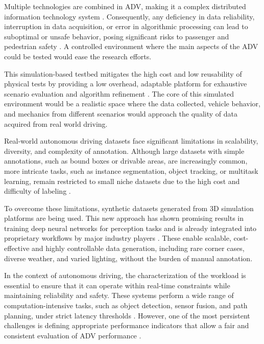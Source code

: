  Multiple technologies are combined in ADV, making it a complex distributed information technology system \cite{Traub2017}. Consequently, any deficiency in data reliability, interruption in data acquisition, or error in algorithmic processing can lead to suboptimal or unsafe behavior, posing significant risks to passenger and pedestrian safety \cite{Zhao2024}. A controlled environment where the main aspects of the ADV could be tested would ease the research efforts. 

This simulation-based testbed mitigates the high cost and low reusability of physical tests by providing a low overhead, adaptable platform for exhaustive scenario evaluation and algorithm refinement \cite{Cao2024AutomaticPreScan, Jeon2024ImplementationAlgorithms}. The core of this simulated environment would be a realistic space where the data collected, vehicle behavior, and mechanics from different scenarios would approach the quality of data acquired from real world driving.

Real-world autonomous driving datasets face significant limitations in scalability, diversity, and complexity of annotation. Although large datasets with simple annotations, such as bound boxes or drivable areas, are increasingly common, more intricate tasks, such as instance segmentation, object tracking, or multitask learning, remain restricted to small niche datasets due to the high cost and difficulty of labeling \cite{Yu_2020_CVPR}.

To overcome these limitations, synthetic datasets generated from 3D simulation platforms are being used. This new approach has shown promising results in training deep neural networks for perception tasks and is already integrated into proprietary workflows by major industry players \cite{Jang2022Carfree:Simulator}.  These enable scalable, cost-effective and highly controllable data generation, including rare corner cases, diverse weather, and varied lighting, without the burden of manual annotation.

In the context of autonomous driving, the characterization of the workload is essential to ensure that it can operate within real-time constraints while maintaining reliability and safety. These systems perform a wide range of computation-intensive tasks, such as object detection, sensor fusion, and path planning, under strict latency thresholds \cite{Liu2023COLA:Systems}. However, one of the most persistent challenges is defining appropriate performance indicators that allow a fair and consistent evaluation of ADV performance \cite{Kowalczyk2022EfficientVerification}. %

